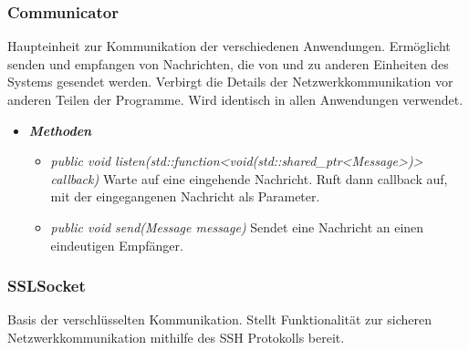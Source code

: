 \documentclass[a4paper,12pt]{article}
\begin{document}
\subsubsection{Communicator}

Haupteinheit zur Kommunikation der verschiedenen Anwendungen. Ermöglicht senden und empfangen von Nachrichten, die von und zu anderen Einheiten des Systems gesendet werden. Verbirgt die Details der Netzwerkkommunikation vor anderen Teilen der Programme. Wird identisch in allen Anwendungen verwendet.

	\begin{itemize}[label={}]

	\item\textit{\textbf{Methoden}}
		\begin{itemize}[label={\textbullet}]
			\item\textit{public void listen(std::function<void(std::shared\_ptr<Message>)> callback)} Warte auf eine eingehende Nachricht. Ruft dann callback auf, mit der eingegangenen Nachricht als Parameter.
			\item\textit{public void send(Message message)} Sendet eine Nachricht an einen eindeutigen Empfänger.

		\end{itemize}

\end{itemize}


\subsubsection{SSLSocket}

Basis der verschlüsselten Kommunikation. Stellt Funktionalität zur sicheren Netzwerkkommunikation mithilfe des SSH Protokolls bereit.
\end{document}
